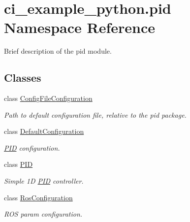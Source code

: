 \hypertarget{namespaceci__example__python_1_1pid}{}\section{ci\+\_\+example\+\_\+python.\+pid Namespace Reference}
\label{namespaceci__example__python_1_1pid}


Brief description of the pid module.  


\subsection*{Classes}
\begin{DoxyCompactItemize}
\item 
class \hyperlink{classci__example__python_1_1pid_1_1ConfigFileConfiguration}{Config\+File\+Configuration}
\begin{DoxyCompactList}\small\item\em Path to default configuration file, relative to the pid package. \end{DoxyCompactList}\item 
class \hyperlink{classci__example__python_1_1pid_1_1DefaultConfiguration}{Default\+Configuration}
\begin{DoxyCompactList}\small\item\em \hyperlink{classci__example__python_1_1pid_1_1PID}{P\+ID} configuration. \end{DoxyCompactList}\item 
class \hyperlink{classci__example__python_1_1pid_1_1PID}{P\+ID}
\begin{DoxyCompactList}\small\item\em Simple 1D \hyperlink{classci__example__python_1_1pid_1_1PID}{P\+ID} controller. \end{DoxyCompactList}\item 
class \hyperlink{classci__example__python_1_1pid_1_1RosConfiguration}{Ros\+Configuration}
\begin{DoxyCompactList}\small\item\em R\+OS param configuration. \end{DoxyCompactList}\end{DoxyCompactItemize}
